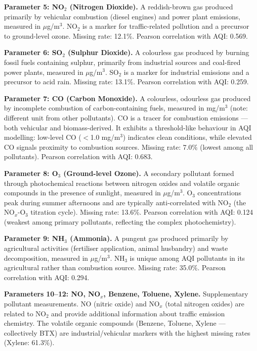 \documentclass[12pt,a4paper]{report}
\begin{document}
\textbf{Parameter 5: NO$_2$ (Nitrogen Dioxide).} A reddish-brown gas produced primarily by vehicular combustion (diesel engines) and power plant emissions, measured in $\mu$g/m$^3$. NO$_2$ is a marker for traffic-related pollution and a precursor to ground-level ozone. Missing rate: 12.1\%. Pearson correlation with AQI: 0.569.

\textbf{Parameter 6: SO$_2$ (Sulphur Dioxide).} A colourless gas produced by burning fossil fuels containing sulphur, primarily from industrial sources and coal-fired power plants, measured in $\mu$g/m$^3$. SO$_2$ is a marker for industrial emissions and a precursor to acid rain. Missing rate: 13.1\%. Pearson correlation with AQI: 0.259.

\textbf{Parameter 7: CO (Carbon Monoxide).} A colourless, odourless gas produced by incomplete combustion of carbon-containing fuels, measured in mg/m$^3$ (note: different unit from other pollutants). CO is a tracer for combustion emissions --- both vehicular and biomass-derived. It exhibits a threshold-like behaviour in AQI modelling: low-level CO ($<$1.0 mg/m$^3$) indicates clean conditions, while elevated CO signals proximity to combustion sources. Missing rate: 7.0\% (lowest among all pollutants). Pearson correlation with AQI: 0.683.

\textbf{Parameter 8: O$_3$ (Ground-level Ozone).} A secondary pollutant formed through photochemical reactions between nitrogen oxides and volatile organic compounds in the presence of sunlight, measured in $\mu$g/m$^3$. O$_3$ concentrations peak during summer afternoons and are typically anti-correlated with NO$_2$ (the NO$_x$-O$_3$ titration cycle). Missing rate: 13.6\%. Pearson correlation with AQI: 0.124 (weakest among primary pollutants, reflecting the complex photochemistry).

\textbf{Parameter 9: NH$_3$ (Ammonia).} A pungent gas produced primarily by agricultural activities (fertiliser application, animal husbandry) and waste decomposition, measured in $\mu$g/m$^3$. NH$_3$ is unique among AQI pollutants in its agricultural rather than combustion source. Missing rate: 35.0\%. Pearson correlation with AQI: 0.294.

\textbf{Parameters 10--12: NO, NO$_x$, Benzene, Toluene, Xylene.} Supplementary pollutant measurements. NO (nitric oxide) and NO$_x$ (total nitrogen oxides) are related to NO$_2$ and provide additional information about traffic emission chemistry. The volatile organic compounds (Benzene, Toluene, Xylene --- collectively BTX) are industrial/vehicular markers with the highest missing rates (Xylene: 61.3\%).
\end{document}
